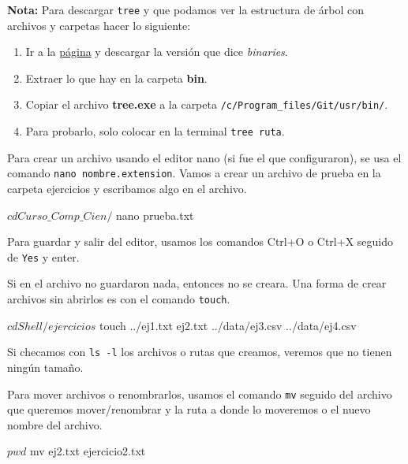 \documentclass[
]{book}
\newenvironment{Shaded}{\begin{snugshade}}{\end{snugshade}}
\newcommand{\ExtensionTok}[1]{#1}
\newcommand{\NormalTok}[1]{#1}
\begin{document}
\textbf{Nota:} Para descargar \texttt{tree} y que podamos ver la estructura de árbol con archivos y carpetas hacer lo siguiente:

\begin{enumerate}
\def\labelenumi{\arabic{enumi})}
\item
  Ir a la \href{https://gnuwin32.sourceforge.net/packages/tree.htm}{página} y descargar la versión que dice \emph{binaries}.
\item
  Extraer lo que hay en la carpeta \textbf{bin}.
\item
  Copiar el archivo \textbf{tree.exe} a la carpeta \texttt{/c/Program\_files/Git/usr/bin/}.
\item
  Para probarlo, solo colocar en la terminal \texttt{tree\ ruta}.
\end{enumerate}

Para crear un archivo usando el editor nano (si fue el que configuraron), se usa el comando \texttt{nano\ nombre.extension}.
Vamos a crear un archivo de prueba en la carpeta ejercicios y escribamos algo en el archivo.

\begin{Shaded}
\begin{Highlighting}[]
\ExtensionTok{$}\NormalTok{ cd Curso\_Comp\_Cien/}
\ExtensionTok{$}\NormalTok{ nano prueba.txt}
\end{Highlighting}
\end{Shaded}

Para guardar y salir del editor, usamos los comandos Ctrl+O o Ctrl+X seguido de \texttt{Yes} y enter.

Si en el archivo no guardaron nada, entonces no se creara. Una forma de crear archivos sin abrirlos es con el comando \texttt{touch}.

\begin{Shaded}
\begin{Highlighting}[]
\ExtensionTok{$}\NormalTok{ cd Shell/ejercicios}
\ExtensionTok{$}\NormalTok{ touch ../ej1.txt ej2.txt ../data/ej3.csv ../data/ej4.csv}
\end{Highlighting}
\end{Shaded}

Si checamos con \texttt{ls\ -l} los archivos o rutas que creamos, veremos que no tienen ningún tamaño.

Para mover archivos o renombrarlos, usamos el comando \texttt{mv} seguido del archivo que queremos mover/renombrar y la ruta a donde lo moveremos o el nuevo nombre del archivo.

\begin{Shaded}
\begin{Highlighting}[]
\ExtensionTok{$}\NormalTok{ pwd}
\ExtensionTok{$}\NormalTok{ mv ej2.txt ejercicio2.txt}
\end{Highlighting}
\end{Shaded}
\end{document}
